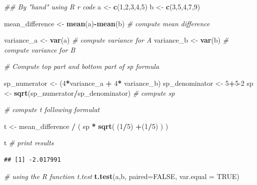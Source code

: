 \documentclass[]{book}
\newenvironment{Shaded}{\begin{snugshade}}{\end{snugshade}}
\newcommand{\CommentTok}[1]{\textcolor[rgb]{0.56,0.35,0.01}{\textit{#1}}}
\newcommand{\DataTypeTok}[1]{\textcolor[rgb]{0.13,0.29,0.53}{#1}}
\newcommand{\DecValTok}[1]{\textcolor[rgb]{0.00,0.00,0.81}{#1}}
\newcommand{\KeywordTok}[1]{\textcolor[rgb]{0.13,0.29,0.53}{\textbf{#1}}}
\newcommand{\NormalTok}[1]{#1}
\newcommand{\OperatorTok}[1]{\textcolor[rgb]{0.81,0.36,0.00}{\textbf{#1}}}
\newcommand{\OtherTok}[1]{\textcolor[rgb]{0.56,0.35,0.01}{#1}}
\newcommand{\StringTok}[1]{\textcolor[rgb]{0.31,0.60,0.02}{#1}}
\begin{document}
\begin{Shaded}
\begin{Highlighting}[]
\CommentTok{## By "hand" using R r code}
\NormalTok{a <-}\StringTok{ }\KeywordTok{c}\NormalTok{(}\DecValTok{1}\NormalTok{,}\DecValTok{2}\NormalTok{,}\DecValTok{3}\NormalTok{,}\DecValTok{4}\NormalTok{,}\DecValTok{5}\NormalTok{)}
\NormalTok{b <-}\StringTok{ }\KeywordTok{c}\NormalTok{(}\DecValTok{3}\NormalTok{,}\DecValTok{5}\NormalTok{,}\DecValTok{4}\NormalTok{,}\DecValTok{7}\NormalTok{,}\DecValTok{9}\NormalTok{)}

\NormalTok{mean_difference <-}\StringTok{ }\KeywordTok{mean}\NormalTok{(a)}\OperatorTok{-}\KeywordTok{mean}\NormalTok{(b) }\CommentTok{# compute mean difference}

\NormalTok{variance_a <-}\StringTok{ }\KeywordTok{var}\NormalTok{(a) }\CommentTok{# compute variance for A}
\NormalTok{variance_b <-}\StringTok{ }\KeywordTok{var}\NormalTok{(b) }\CommentTok{# compute variance for B}

\CommentTok{# Compute top part and bottom part of sp formula}

\NormalTok{sp_numerator <-}\StringTok{ }\NormalTok{(}\DecValTok{4}\OperatorTok{*}\NormalTok{variance_a }\OperatorTok{+}\StringTok{ }\DecValTok{4}\OperatorTok{*}\StringTok{ }\NormalTok{variance_b) }
\NormalTok{sp_denominator <-}\StringTok{ }\DecValTok{5}\OperatorTok{+}\DecValTok{5-2}
\NormalTok{sp <-}\StringTok{ }\KeywordTok{sqrt}\NormalTok{(sp_numerator}\OperatorTok{/}\NormalTok{sp_denominator) }\CommentTok{# compute sp}


\CommentTok{# compute t following formulat}

\NormalTok{t <-}\StringTok{ }\NormalTok{mean_difference }\OperatorTok{/}\StringTok{ }\NormalTok{( sp }\OperatorTok{*}\StringTok{ }\KeywordTok{sqrt}\NormalTok{( (}\DecValTok{1}\OperatorTok{/}\DecValTok{5}\NormalTok{) }\OperatorTok{+}\NormalTok{(}\DecValTok{1}\OperatorTok{/}\DecValTok{5}\NormalTok{) ) )}

\NormalTok{t }\CommentTok{# print results}
\end{Highlighting}
\end{Shaded}

\begin{verbatim}
## [1] -2.017991
\end{verbatim}

\begin{Shaded}
\begin{Highlighting}[]
\CommentTok{# using the R function t.test}
\KeywordTok{t.test}\NormalTok{(a,b, }\DataTypeTok{paired=}\OtherTok{FALSE}\NormalTok{, }\DataTypeTok{var.equal =} \OtherTok{TRUE}\NormalTok{)}
\end{Highlighting}
\end{Shaded}
\end{document}
